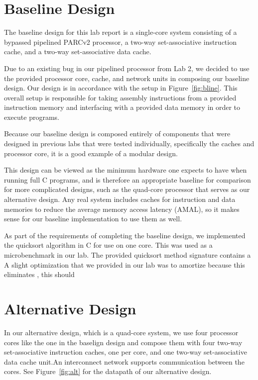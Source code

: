 \documentclass[10pt]{article}
\begin{document}
\section{Baseline Design}

The baseline design for this lab report is a single-core system consisting of a bypassed pipelined PARCv2 
processor, a two-way set-associative instruction cache, and a two-way set-associative data cache. 

Due to an existing bug in our pipelined processor from Lab 2, we decided to use the provided processor core, 
cache, and network units in composing our baseline design. Our design is in accordance with the setup in 
Figure~\ref{fig:bline}. This overall setup is responsible for taking assembly instructions from a provided
instruction memory and interfacing with a provided data memory in order to execute programs.

Because our baseline design is composed entirely of components that were designed in previous labs that were 
tested individually, specifically the caches and processor core, it is a good example of a modular design. 

This design can be viewed as the minimum hardware one expects to have when running full C programs, and is therefore
an appropriate baseline for comparison for more complicated designs, such as the quad-core processor that serves as
our alternative design. Any real system includes caches for instruction and data memories to reduce the average memory
access latency (AMAL), so it makes sense for our baseline implementation to use them as well. 

As part of the requirements of completing the baseline design, we implemented the quicksort algorithm in C for use on
one core. This was used as a microbenchmark in our lab. The provided quicksort method signature contains a A slight optimization that we provided in our lab was to amortize
because this eliminates , this should 



\section{Alternative Design}

In our alternative design, which is a quad-core system, we use four processor cores like the one in the baselign design and compose them with four two-way set-associative instruction caches, one per core, and one two-way set-associative data cache unit.An interconnect network supports communication between the cores. See Figure~\ref{fig:alt} for the datapath of our alternative design.
\end{document}
